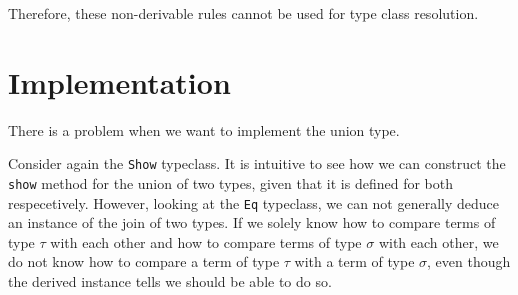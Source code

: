 Therefore, these non-derivable rules cannot be used for type class resolution.








\section{Implementation}

There is a problem when we want to implement the union type.

Consider again the \texttt{Show} typeclass. It is intuitive to see how we can construct the \texttt{show} method for the union of two types, given that it is defined for both respecetively.
However, looking at the \texttt{Eq} typeclass, we can not generally deduce an instance of the join of two types.
If we solely know how to compare terms of type $\tau$ with each other and how to compare terms of type $\sigma$ with each other,
we do not know how to compare a term of type $\tau$ with a term of type $\sigma$, even though the derived instance tells we should be able to do so.

